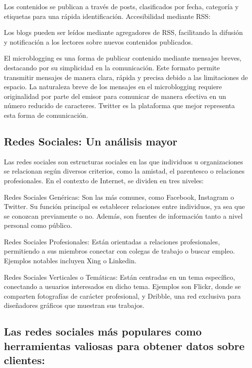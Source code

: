 \documentclass[
    a4paper, %
    10pt, %
    unnumberedsections, %
    twoside, %
]{LTJournalArticle}
\begin{document}
Los contenidos se publican a través de posts, clasificados por fecha, categoría y etiquetas para una rápida identificación.
Accesibilidad mediante RSS:

Los blogs pueden ser leídos mediante agregadores de RSS, facilitando la difusión y notificación a los lectores sobre nuevos contenidos publicados.


El microblogging es una forma de publicar contenido mediante mensajes breves, destacando por su simplicidad en la comunicación. Este formato permite transmitir mensajes de manera clara, rápida y precisa debido a las limitaciones de espacio. La naturaleza breve de los mensajes en el microblogging requiere originalidad por parte del emisor para comunicar de manera efectiva en un número reducido de caracteres. Twitter es la plataforma que mejor representa esta forma de comunicación.


\subsection{Redes Sociales: Un análisis mayor}

Las redes sociales son estructuras sociales en las que individuos u organizaciones se relacionan según diversos criterios, como la amistad, el parentesco o relaciones profesionales. En el contexto de Internet, se dividen en tres niveles:

Redes Sociales Genéricas: Son las más comunes, como Facebook, Instagram o Twitter. Su función principal es establecer relaciones entre individuos, ya sea que se conozcan previamente o no. Además, son fuentes de información tanto a nivel personal como público.

Redes Sociales Profesionales: Están orientadas a relaciones profesionales, permitiendo a sus miembros conectar con colegas de trabajo o buscar empleo. Ejemplos notables incluyen Xing o Linkedin.

Redes Sociales Verticales o Temáticas: Están centradas en un tema específico, conectando a usuarios interesados en dicho tema. Ejemplos son Flickr, donde se comparten fotografías de carácter profesional, y Dribble, una red exclusiva para diseñadores gráficos que muestran sus trabajos.



\subsection{Las redes sociales más populares como herramientas valiosas para obtener datos sobre clientes:}
\end{document}
